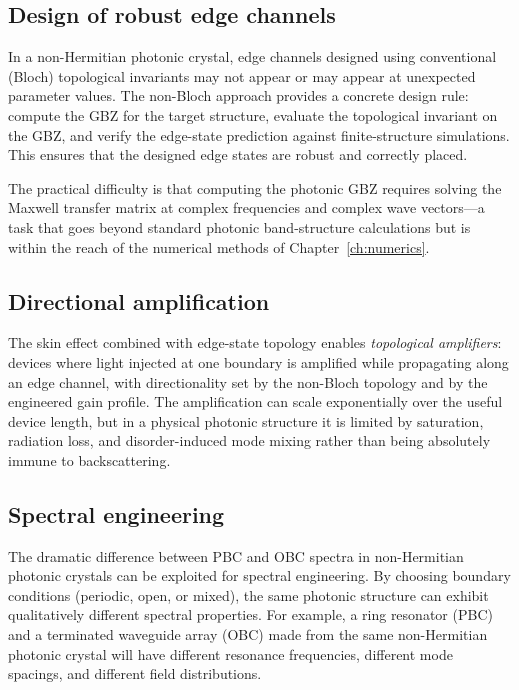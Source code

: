 \subsection{Design of robust edge channels}
\label{ssec:robust-edge}

In a non-Hermitian photonic crystal, edge channels designed using
conventional (Bloch) topological invariants may not appear or may appear
at unexpected parameter values. The non-Bloch approach provides a
concrete design rule: compute the GBZ for the target structure, evaluate
the topological invariant on the GBZ, and verify the edge-state
prediction against finite-structure simulations. This ensures that
the designed edge states are robust and correctly placed.

The practical difficulty is that computing the photonic GBZ requires
solving the Maxwell transfer matrix at complex frequencies and complex
wave vectors---a task that goes beyond standard photonic band-structure
calculations but is within the reach of the numerical methods of
Chapter~\ref{ch:numerics}.

\subsection{Directional amplification}
\label{ssec:directional-amp}

The skin effect combined with edge-state topology enables
\emph{topological amplifiers}: devices where light injected at one
boundary is amplified while propagating along an edge channel,
with directionality set by the non-Bloch topology and by the engineered
gain profile. The amplification can scale exponentially over the useful
device length, but in a physical photonic structure it is limited by
saturation, radiation loss, and disorder-induced mode mixing rather than
being absolutely immune to backscattering.

\subsection{Spectral engineering}
\label{ssec:spectral-engineering}

The dramatic difference between PBC and OBC spectra in non-Hermitian
photonic crystals can be exploited for spectral engineering. By
choosing boundary conditions (periodic, open, or mixed), the same
photonic structure can exhibit qualitatively different spectral
properties. For example, a ring resonator (PBC) and a terminated
waveguide array (OBC) made from the same non-Hermitian photonic crystal
will have different resonance frequencies, different mode spacings, and
different field distributions.

